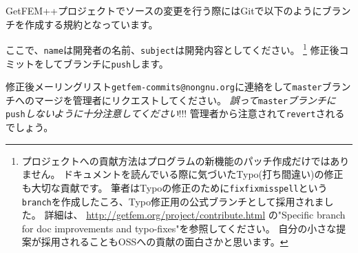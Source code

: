 \documentclass{../../style/ltjoc}
\begin{document}
GetFEM++プロジェクトでソースの変更を行う際にはGitで以下のようにブランチを作成する規約となっています。
\begin{shbox}
\end{shbox}
ここで、\texttt{name}は開発者の名前、\texttt{subject}は開発内容としてください。
\footnote{
プロジェクトへの貢献方法はプログラムの新機能のパッチ作成だけではありません。
ドキュメントを読んでいる際に気づいたTypo(打ち間違い)の修正も大切な貢献です。
筆者はTypoの修正のために\texttt{fixfixmisspell}という\texttt{branch}を作成したころ、Typo修正用の公式ブランチとして採用されました。
詳細は、 \href{http://getfem.org/project/contribute.html}{http://getfem.org/project/contribute.html} の"Specific branch for doc improvements and typo-fixes"を参照してください。
自分の小さな提案が採用されることもOSSへの貢献の面白さかと思います。
}
修正後コミットをしてブランチに\texttt{push}します。
\begin{shbox}
\end{shbox}
修正後メーリングリスト\texttt{getfem-commits@nongnu.org}に連絡をして\texttt{master}ブランチへのマージを管理者にリクエストしてください。
\emph{誤って}\texttt{master}\emph{ブランチに}\texttt{push}\emph{しないように十分注意してください}!!!
管理者から注意されて\texttt{revert}されるでしょう。
\end{document}
